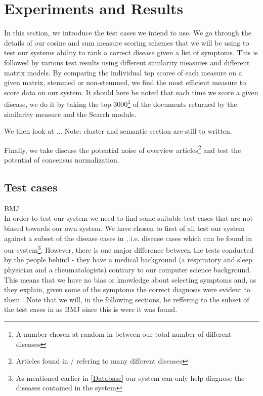 \chapter{Experiments and Results\label{ExperimentsResults}}

In this section, we introduce the test cases we intend to use. We go
through the details of our cosine and sum measure scoring schemes that
we will be using to test our systems ability to rank a correct disease
given a list of symptoms. This is followed by various test results
using different similarity measures and different matrix models. By
comparing the individual top scores of each measure on a given matrix,
stemmed or non-stemmed, we find the most efficient measure to score
data on our system. It should here be noted that each time we score a
given disease, we do it by taking the top 3000\footnote{A number
  chosen at random in between our total number of different diseases}
of the documents returned by the similarity measure and the Search
module.

We then look at ... Note: cluster and semantic section are still to
written.

Finally, we take discuss the potential noise of overview
articles\footnote{Articles found in / refering to many different
  diseases} and test the potential of concensus normalization.

\section{Test cases}

BMJ \\
In order to test our system we need to find some suitable test
cases that are not biased towards our own system. We have chosen to
first of all test our system against a subset of the disease cases in
\cite{HangwiTang11102006}, i.e. disease cases which can be found in
our system\footnote{As mentioned earlier in \ref{Database} our system
  can only help diagnose the diseases contained in the
  system}. However, there is one major difference between the tests
conducted by the people behind \cite{HangwiTang11102006} - they have a
medical background (a respiratory and sleep physician and a
rheumatologists) contrary to our computer science background. This
means that we have no bias or knowledge about selecting symptoms and,
as they explain, given some of the symptoms the correct diagnosis were
evident to them \cite{HangwiTang11102006}. Note that we will, in the
following sections, be reffering to the subset of the test cases in
\cite{HangwiTang11102006} as BMJ since this is were it was found.

